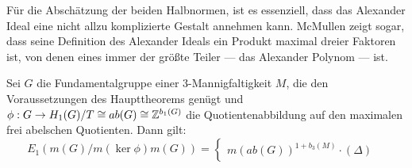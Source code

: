     Für die Abschätzung der beiden Halbnormen, ist es essenziell, dass das Alexander Ideal eine nicht allzu komplizierte Gestalt annehmen kann. McMullen zeigt \cite{McMullen2002} sogar, dass seine Definition des Alexander Ideals ein Produkt maximal dreier Faktoren ist, von denen eines immer der größte Teiler --- das Alexander Polynom --- ist. 

\begin{thm}
	Sei $G$ die Fundamentalgruppe einer 3-Mannigfaltigkeit $M$, die den Voraussetzungen des Haupttheorems genügt und $\phi:G \to H_1(G)/T \cong ab(G) \cong \mathbb{Z}^{b_1(G)}$ die Quotientenabbildung auf den maximalen frei abelschen Quotienten. Dann gilt:
	\[
		E_1(m(G)/m(\ker\phi)m(G)) = 
				\begin{cases}
    				m(ab(G))^{1+b_3(M)}\cdot (\Delta) & 
    			\end{cases}
	\]
\end{thm}
